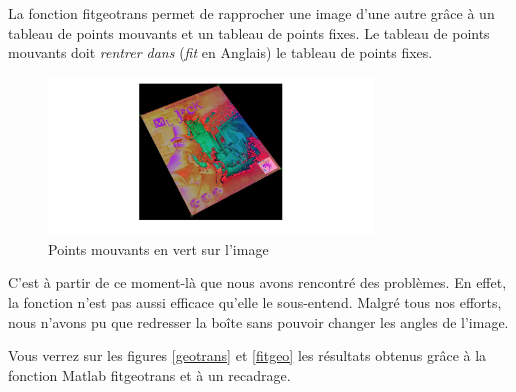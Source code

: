\documentclass{st50_template}
\begin{document}
La fonction fitgeotrans permet de rapprocher une image d'une autre grâce à un tableau de points mouvants et un tableau de points fixes. Le tableau de points mouvants doit \emph{rentrer dans} (\emph{fit} en Anglais) le tableau de points fixes.

\begin{figure}[ht]
    \centering
    \includegraphics[width=0.77\textwidth]{images/movingPoints.jpg}
    \caption{Points mouvants en vert sur l'image}
    \label{movingPoints}
\end{figure}


C'est à partir de ce moment-là que nous avons rencontré des problèmes. En effet, la fonction n'est pas aussi efficace qu'elle le sous-entend. Malgré tous nos efforts, nous n'avons pu que redresser la boîte sans pouvoir changer les angles de l'image.

Vous verrez sur les figures \ref{geotrans} et \ref{fitgeo} les résultats obtenus grâce à la fonction Matlab fitgeotrans et à un recadrage.
\end{document}
